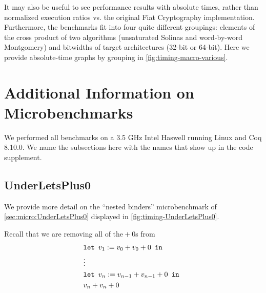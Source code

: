 \begin{subappendices}
It may also be useful to see performance results with absolute times, rather than normalized execution ratios {vs.} the original Fiat Cryptography implementation.
Furthermore, the benchmarks fit into four quite different groupings: elements of the cross product of two algorithms (unsaturated Solinas and word-by-word Montgomery) and bitwidths of target architectures (32-bit or 64-bit).
Here we provide absolute-time graphs by grouping in \autoref{fig:timing-macro-various}.

\clearpage

\section{Additional Information on Microbenchmarks}\label{sec:additionalMicro}

We performed all benchmarks on a 3.5 GHz Intel Haswell running Linux and Coq 8.10.0.
We name the subsections here with the names that show up in the code supplement.

\subsection{UnderLetsPlus0}\label{sec:UnderLetsPlus0-more}

We provide more detail on the ``nested binders'' microbenchmark of \autoref{sec:micro:UnderLetsPlus0} displayed in \autoref{fig:timing-UnderLetsPlus0}.

Recall that we are removing all of the${}+0$s from
{\small \begin{align*}
  & \letin[{v_1 := v_0 + v_0 + 0}{}] \\
  & \vdots \\
  & \letin[{v_n := v_{n-1} + v_{n-1} + 0}{}] \\
  & v_n + v_n + 0
\end{align*}}%


\end{subappendices}
